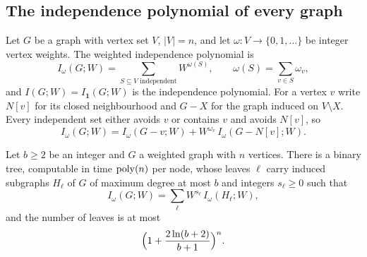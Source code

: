 \subsection{The independence polynomial of every graph}\label{ssec:indep}
Let $G$ be a graph with vertex set $V$, $|V|=n$, and let $\omega:V\to\{0,1,\dots\}$
be integer vertex weights. The weighted independence polynomial is
\begin{equation}\label{eq:indeppoly}
  I_\omega(G;W)=\sum_{S\subseteq V\text{ independent}}W^{\omega(S)},\qquad \omega(S)=\sum_{v\in S}\omega_v ,
\end{equation}
and $I(G;W)=I_{\mathbf 1}(G;W)$ is the independence polynomial. For a vertex $v$
write $N[v]$ for its closed neighbourhood and $G-X$ for the graph induced on
$V\setminus X$. Every independent set either avoids $v$ or contains $v$ and
avoids $N[v]$, so
\begin{equation}\label{eq:indeprec}
  I_\omega(G;W)=I_\omega(G-v;W)+W^{\omega_v}\,I_\omega(G-N[v];W).
\end{equation}

\begin{lemma}\label{lem:branch}
Let $b\ge2$ be an integer and $G$ a weighted graph with $n$ vertices. There is a
binary tree, computable in time $\operatorname{poly}(n)$ per node, whose leaves $\ell$ carry
induced subgraphs $H_\ell$ of $G$ of maximum degree at most $b$ and integers
$s_\ell\ge0$ such that
\begin{equation}\label{eq:branchexp}
  I_\omega(G;W)=\sum_{\ell}W^{s_\ell}\,I_\omega(H_\ell;W),
\end{equation}
and the number of leaves is at most
\begin{equation}\label{eq:leaves}
  \Bigl(1+\frac{2\ln(b+2)}{b+1}\Bigr)^{n}.
\end{equation}
\end{lemma}

